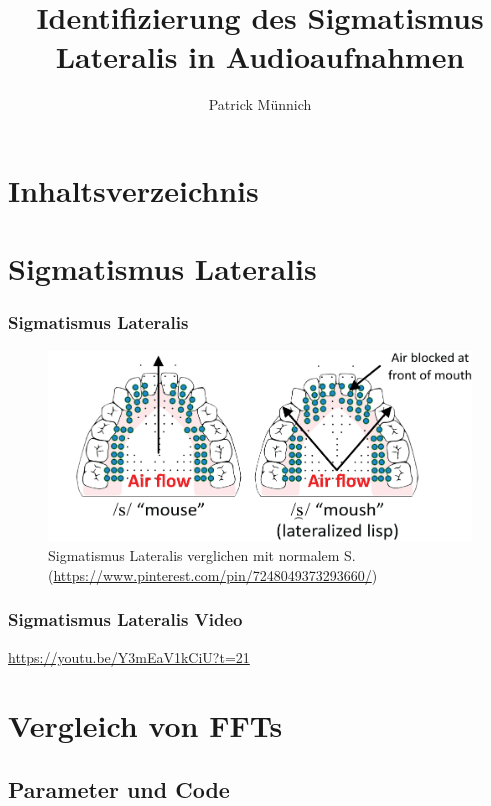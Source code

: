 \documentclass[11pt]{beamer}
\author{Patrick M\"unnich}
\title{Identifizierung des Sigmatismus Lateralis in Audioaufnahmen}
\institute{Hochschule D\"usseldorf}
\begin{document}
\begin{frame}
\titlepage
\end{frame}

\section{Inhaltsverzeichnis}

\begin{frame}
\tableofcontents
\end{frame}

\section{Sigmatismus Lateralis}

\begin{frame}
\frametitle{Sigmatismus Lateralis}
\begin{figure}
\includegraphics[scale=0.4]{lateral_lisp.png}
\caption{Sigmatismus Lateralis verglichen mit normalem S. (\url{https://www.pinterest.com/pin/7248049373293660/})}
\end{figure}
\end{frame}

\begin{frame}
\frametitle{Sigmatismus Lateralis Video}
\centering
\url{https://youtu.be/Y3mEaV1kCiU?t=21}
\end{frame}

\section{Vergleich von FFTs}

\subsection{Parameter und Code}
\end{document}

